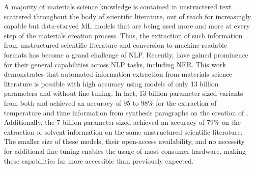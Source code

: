 \label{chap:abstract}

A majority of materials science knowledge is contained in unstructered text scattered throughout the body of scientific literature, out of reach for increasingly capable but data-starved \acrlong{ML} models that are being used more and more at every step of the materials creation process.
Thus, the extraction of such information from unstructured scientific literature and conversion to machine-readable formats has become a grand challenge of \acrlong{NLP}.
Recently,  have gained prominence for their general capabilities across \acrlong{NLP} tasks, including \acrlong{NER}.
This work demonstrates that automated information extraction from materials science literature is possible with high accuracy using models of only 13 billion parameters and without fine-tuning.
In fact, 13 billion parameter sized variants from both  and  achieved an accuracy of 95 to 98\% for the extraction of temperature and time information from synthesis paragraphs on the creation of .
Additionally, the 7 billion parameter sized  achieved an accuracy of 79\% on the extraction of solvent information on the same unstructured scientific literature.
The smaller size of these models, their open-access availability, and no necessity for additional fine-tuning enables the usage of most consumer hardware, making these capabilities far more accessible than previously expected.

